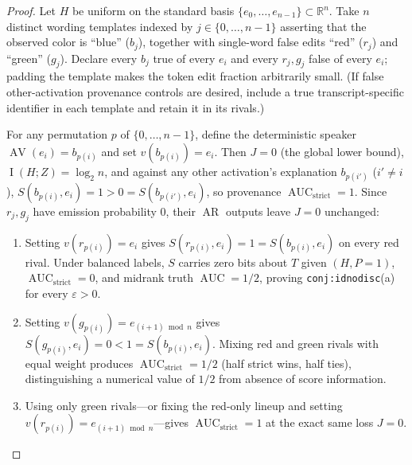 \documentclass[11pt]{article}
\theoremstyle{plain}
\theoremstyle{definition}
\theoremstyle{remark}
\DeclareMathOperator{\AUC}{AUC}
\DeclareMathOperator{\AV}{AV}
\DeclareMathOperator{\AR}{AR}
\DeclareMathOperator{\MI}{I}
\begin{document}
\begin{proof}
Let $H$ be uniform on the standard basis $\{e_0, \dots, e_{n-1}\} \subset \mathbb{R}^n$. Take $n$ distinct wording templates indexed by $j \in \{0, \dots, n-1\}$ asserting that the observed color is ``blue'' ($b_j$), together with single-word false edits ``red'' ($r_j$) and ``green'' ($g_j$). Declare every $b_j$ true of every $e_i$ and every $r_j, g_j$ false of every $e_i$; padding the template makes the token edit fraction arbitrarily small. (If false other-activation provenance controls are desired, include a true transcript-specific identifier in each template and retain it in its rivals.)

For any permutation $p$ of $\{0, \dots, n-1\}$, define the deterministic speaker $\AV(e_i) = b_{p(i)}$ and set $v(b_{p(i)}) = e_i$. Then $J = 0$ (the global lower bound), $\MI(H; Z) = \log_2 n$, and against any other activation's explanation $b_{p(i')}$ ($i' \neq i$), $S(b_{p(i)}, e_i) = 1 > 0 = S(b_{p(i')}, e_i)$, so provenance $\AUC_{\mathrm{strict}} = 1$. Since $r_j, g_j$ have emission probability $0$, their $\AR$ outputs leave $J = 0$ unchanged:
\begin{enumerate}[label=\textup{(\arabic*)},leftmargin=2em,itemsep=2pt]
\item Setting $v(r_{p(i)}) = e_i$ gives $S(r_{p(i)}, e_i) = 1 = S(b_{p(i)}, e_i)$ on every red rival. Under balanced labels, $S$ carries zero bits about $T$ given $(H, P = 1)$, $\AUC_{\mathrm{strict}} = 0$, and midrank truth $\AUC = 1/2$, proving \texttt{conj:idnodisc}(a) for every $\varepsilon > 0$.
\item Setting $v(g_{p(i)}) = e_{(i+1)\bmod n}$ gives $S(g_{p(i)}, e_i) = 0 < 1 = S(b_{p(i)}, e_i)$. Mixing red and green rivals with equal weight produces $\AUC_{\mathrm{strict}} = 1/2$ (half strict wins, half ties), distinguishing a numerical value of $1/2$ from absence of score information.
\item Using only green rivals---or fixing the red-only lineup and setting $v(r_{p(i)}) = e_{(i+1)\bmod n}$---gives $\AUC_{\mathrm{strict}} = 1$ at the exact same loss $J = 0$. \qedhere
\end{enumerate}
\end{proof}
\end{document}
